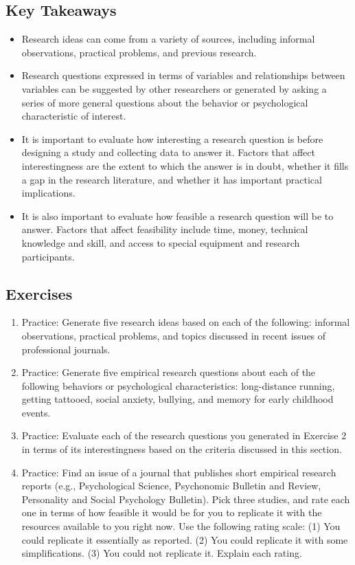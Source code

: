 \subsection{Key Takeaways}
\begin{fullwidth}
\begin{itemize}
\item Research ideas can come from a variety of sources, including informal observations, practical problems, and previous research.
\item Research questions expressed in terms of variables and relationships between variables can be suggested by other researchers or generated by asking a series of more general questions about the behavior or psychological characteristic of interest.
\item It is important to evaluate how interesting a research question is before designing a study and collecting data to answer it. Factors that affect interestingness are the extent to which the answer is in doubt, whether it fills a gap in the research literature, and whether it has important practical implications.
\item It is also important to evaluate how feasible a research question will be to answer. Factors that affect feasibility include time, money, technical knowledge and skill, and access to special equipment and research participants.
\end{itemize}
\end{fullwidth}

\subsection{Exercises}
\begin{fullwidth}
\begin{enumerate}
\item Practice: Generate five research ideas based on each of the following: informal observations, practical problems, and topics discussed in recent issues of professional journals.
\item Practice: Generate five empirical research questions about each of the following behaviors or psychological characteristics: long-distance running, getting tattooed, social anxiety, bullying, and memory for early childhood events.
\item Practice: Evaluate each of the research questions you generated in Exercise 2 in terms of its interestingness based on the criteria discussed in this section.
\item Practice: Find an issue of a journal that publishes short empirical research reports (e.g., Psychological Science, Psychonomic Bulletin and Review, Personality and Social Psychology Bulletin). Pick three studies, and rate each one in terms of how feasible it would be for you to replicate it with the resources available to you right now. Use the following rating scale: (1) You could replicate it essentially as reported. (2) You could replicate it with some simplifications. (3) You could not replicate it. Explain each rating.
\end{enumerate}
\end{fullwidth}

